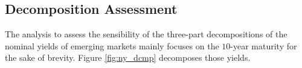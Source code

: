 {%



\subsection{Decomposition Assessment}
\iftoggle{toclinks}{\gototoc}{} %


The analysis to assess the sensibility of the three-part decompositions of the nominal yields of emerging markets mainly focuses on the \(10\)-year maturity for the sake of brevity.
%	
Figure \ref{fig:ny_dcmp} decomposes those yields.

}
